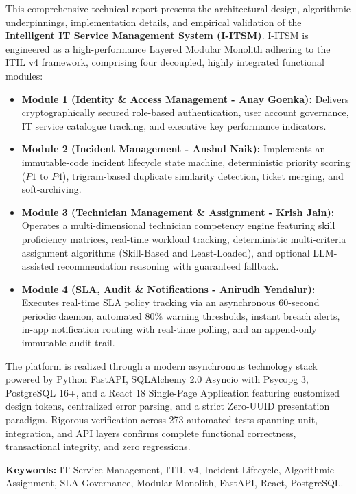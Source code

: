 \documentclass[11pt,a4paper,oneside]{report}
\begin{document}
This comprehensive technical report presents the architectural design, algorithmic underpinnings, implementation details, and empirical validation of the \textbf{Intelligent IT Service Management System (I-ITSM)}. I-ITSM is engineered as a high-performance Layered Modular Monolith adhering to the ITIL v4 framework, comprising four decoupled, highly integrated functional modules:
\begin{itemize}[leftmargin=1.5cm]
    \item \textbf{Module 1 (Identity \& Access Management - Anay Goenka):} Delivers cryptographically secured role-based authentication, user account governance, IT service catalogue tracking, and executive key performance indicators.
    \item \textbf{Module 2 (Incident Management - Anshul Naik):} Implements an immutable-code incident lifecycle state machine, deterministic priority scoring ($P1$ to $P4$), trigram-based duplicate similarity detection, ticket merging, and soft-archiving.
    \item \textbf{Module 3 (Technician Management \& Assignment - Krish Jain):} Operates a multi-dimensional technician competency engine featuring skill proficiency matrices, real-time workload tracking, deterministic multi-criteria assignment algorithms (Skill-Based and Least-Loaded), and optional LLM-assisted recommendation reasoning with guaranteed fallback.
    \item \textbf{Module 4 (SLA, Audit \& Notifications - Anirudh Yendalur):} Executes real-time SLA policy tracking via an asynchronous 60-second periodic daemon, automated 80\% warning thresholds, instant breach alerts, in-app notification routing with real-time polling, and an append-only immutable audit trail.
\end{itemize}

The platform is realized through a modern asynchronous technology stack powered by Python FastAPI, SQLAlchemy 2.0 Asyncio with Psycopg 3, PostgreSQL 16+, and a React 18 Single-Page Application featuring customized design tokens, centralized error parsing, and a strict Zero-UUID presentation paradigm. Rigorous verification across 273 automated tests spanning unit, integration, and API layers confirms complete functional correctness, transactional integrity, and zero regressions.

\vspace{0.8cm}
\noindent\textbf{Keywords:} IT Service Management, ITIL v4, Incident Lifecycle, Algorithmic Assignment, SLA Governance, Modular Monolith, FastAPI, React, PostgreSQL.
\end{document}
